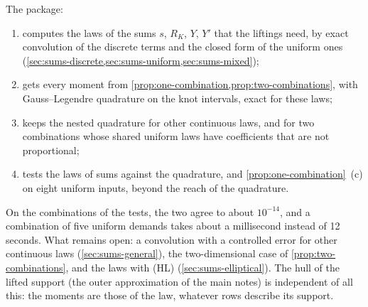 \documentclass[11pt,a4paper]{article}
\numberwithin{equation}{section}
\newcommand{\Hyp}[1]{\textup{(H#1)}}    %
\begin{document}
The package:
\begin{enumerate}[nosep]
\item computes the laws of the sums $s$, $R_K$, $Y$, $Y'$ that the liftings need, by exact convolution of the discrete terms and the closed form of the uniform ones (\cref{sec:sums-discrete,sec:sums-uniform,sec:sums-mixed});
\item gets every moment from \cref{prop:one-combination,prop:two-combinations}, with Gauss--Legendre quadrature on the knot intervals, exact for these laws;
\item keeps the nested quadrature for other continuous laws, and for two combinations whose shared uniform laws have coefficients that are not proportional;
\item tests the laws of sums against the quadrature, and \cref{prop:one-combination}~(c) on eight uniform inputs, beyond the reach of the quadrature.
\end{enumerate}
On the combinations of the tests, the two agree to about $10^{-14}$, and a combination of five uniform demands takes about a millisecond instead of 12 seconds.
What remains open: a convolution with a controlled error for other continuous laws (\cref{sec:sums-general}),
the two-dimensional case of \cref{prop:two-combinations},
and the laws with \Hyp{L} (\cref{sec:sums-elliptical}).
The hull of the lifted support (the outer approximation of the main notes) is independent of all this: the moments are those of the law, whatever rows describe its support.



\end{document}
